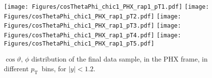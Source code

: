 \documentclass[12pt]{article}
\newcommand{\pt}{$p_{\mathrm{T}}$}
\begin{document}

\begin{figure}[htbp]
\centering
\texttt{[image: Figures/cosThetaPhi\_chic1\_PHX\_rap1\_pT1.pdf]}
\texttt{[image: Figures/cosThetaPhi\_chic1\_PHX\_rap1\_pT2.pdf]}
\texttt{[image: Figures/cosThetaPhi\_chic1\_PHX\_rap1\_pT3.pdf]}
\texttt{[image: Figures/cosThetaPhi\_chic1\_PHX\_rap1\_pT4.pdf]}
\texttt{[image: Figures/cosThetaPhi\_chic1\_PHX\_rap1\_pT5.pdf]}
\caption{$\cos\vartheta,\,\phi$ distribution of the final data sample, 
	in the PHX frame, in different \pt\ bins, for $|y| < 1.2$.}
\end{figure}
\clearpage

%
%
%
\end{document}
